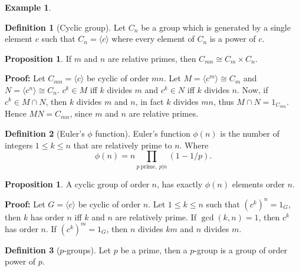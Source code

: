 \documentclass[11pt]{amsbook}%
\theoremstyle{plain}
\theoremstyle{definition}
\newtheorem{definition*}{Definition}
\newtheorem*{example*}{Example}
\newtheorem{proposition}[theorem]{Proposition}
\numberwithin{equation}{section}
\DeclareMathOperator{\gcd}{gcd}
\begin{document}
\begin{example*}
\begin{definition*}[Cyclic group]
  Let $C_{n}$ be a group which is generated by a single element $c$ such that
  $C_{n} = \langle c \rangle$ where every element of $C_{n}$ is a power
  of $c$.
\end{definition*}

\begin{proposition}
  If $m$ and $n$ are relative primes, then $C_{mn} \cong C_{m} \times C_{n}$.
\end{proposition} \vspace{1.8em}
\textbf{Proof: }Let $C_{mn} = \langle c \rangle$ be cyclic of order $mn$.
Let $M = \langle c^{m} \rangle \cong C_{m}$ and $N = \langle c^{n} \rangle \cong C_{n}$.
$c^{k} \in M$ iff $k$ divides $m$ and $c^{k} \in N$ iff $k$ divides $n$.
Now, if $c^{k} \in M \cap N$, then $k$ divides $m$ and $n$, in fact 
$k$ divides $mn$, thus $M \cap N = 1_{C_{mn}}$. Hence $MN = C_{mn}$,
since $m$ and $n$ are relative primes. \qedsymbol

\begin{definition*}[Euler's $\phi$ function]
  Euler's function $\phi(n)$ is the number of integers $1 \leq k \leq n$
  that are relatively prime to $n$. Where 
  $$
  \phi(n) = n \prod_{p \ \text{prime}, \ p \vert n} (1 - 1/p).
  $$
\end{definition*}

\begin{proposition}
  A cyclic group of order $n$, has exactly $\phi(n)$ elements order $n$.
\end{proposition} \vspace{1.8em}
\textbf{Proof: }Let $G = \langle c \rangle$ be cyclic of order $n$.
Let $1 \leq k \leq n$ such that $(c^{k})^{n} = 1_{G}$, then $k$ has order
$n$ iff $k$ and $n$ are relatively prime. If $\gcd(k, n) = 1$, then
$c^{k}$ has order $n$. If $(c^{k})^{m} = 1_{G}$, then $n$ divides
$km$ and $n$ divides $m$. \qedsymbol

\begin{definition*}[$p$-groups]
  Let $p$ be a prime, then a $p$-group is a group of order power
  of $p$.
\end{definition*}


\end{example*}
\end{document}
